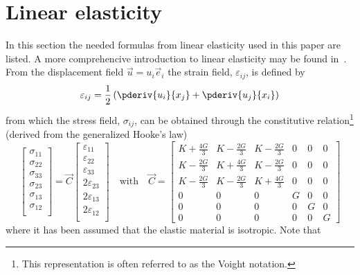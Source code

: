 \section{Linear elasticity}
\label{Sec1:LinearElasticity}
In this section the needed formulas from linear elasticity used in this paper are listed. A more comprehencive introduction to linear elasticity may be found in~\cite{Gould1994itl}. From the displacement field $\vec{u} = u_i\vec{e}_i$ the strain field, $\varepsilon_{ij}$, is defined by
\begin{equation}
	\varepsilon_{ij} = \frac{1}{2}\left(\pderiv{u_i}{x_j} + \pderiv{u_j}{x_i}\right)
\end{equation}
from which the stress field, $\sigma_{ij}$, can be obtained through the constitutive relation\footnote{This representation is often referred to as the Voight notation.} (derived from the generalized Hooke's law) 
\begin{equation}
	\begin{bmatrix}
		\sigma_{11}\\
		\sigma_{22}\\
		\sigma_{33}\\
		\sigma_{23}\\
		\sigma_{13}\\
		\sigma_{12}\\
	\end{bmatrix} = \vec{C}
	\begin{bmatrix}
		\varepsilon_{11}\\
		\varepsilon_{22}\\
		\varepsilon_{33}\\
		2\varepsilon_{23}\\
		2\varepsilon_{13}\\
		2\varepsilon_{12}\\
	\end{bmatrix}\quad\text{with}\quad\vec{C}= \begin{bmatrix}
		K+\frac{4G}{3} & K-\frac{2G}{3} & K-\frac{2G}{3} & 0 & 0 & 0\\
		K-\frac{2G}{3} & K+\frac{4G}{3} & K-\frac{2G}{3} & 0 & 0 & 0\\
		K-\frac{2G}{3} & K-\frac{2G}{3} & K+\frac{4G}{3} & 0 & 0 & 0\\
		0 & 0 & 0 & G & 0 & 0\\
		0 & 0 & 0 & 0 & G & 0\\
		0 & 0 & 0 & 0 & 0 & G
	\end{bmatrix}
\end{equation}
where it has been assumed that the elastic material is isotropic. Note that

